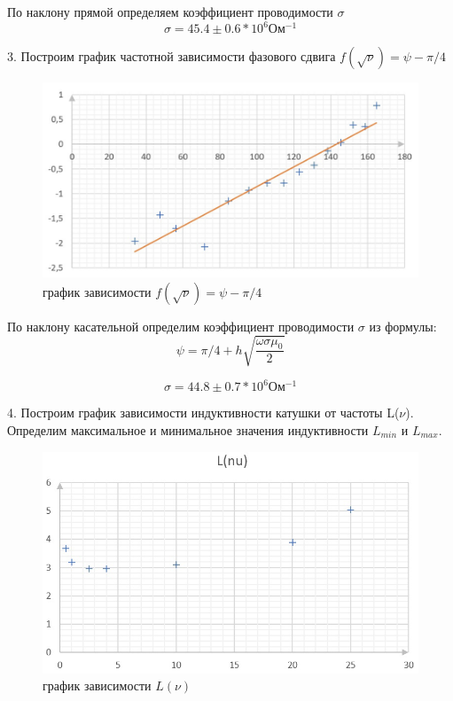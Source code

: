 \documentclass[a4paper, 12pt]{article} %
\begin{document}
По наклону прямой определяем коэффициент проводимости $\sigma$
	\begin{equation*}
\sigma = 45.4 \pm 0.6 * 10^6 Ом^{-1}
	\end{equation*}
	
3. Построим график частотной зависимости фазового сдвига $f(\sqrt{\nu}) = \psi - \pi/4$

		\begin{figure}
		\centering
		\includegraphics[width = 15cm]{graph3.jpg}
		\caption{график зависимости $f(\sqrt{\nu}) = \psi - \pi/4$}
	\end{figure}
	
По наклону касательной определим коэффициент проводимости $\sigma$ из формулы:
	\begin{equation*}
\psi = \pi/4 + h\sqrt{\frac{\omega\sigma\mu_0}{2}}
	\end{equation*}

	\begin{equation*}
\sigma = 44.8 \pm 0.7 * 10^6 Ом^{-1}
	\end{equation*}	
	
4. Построим график зависимости индуктивности катушки от частоты L($\nu$). Определим максимальное и минимальное значения индуктивности $L_{min}$ и $L_{max}$.

		\begin{figure}
		\centering
		\includegraphics[width = 15cm]{graph4.jpg}
		\caption{график зависимости $L(\nu)$}
	\end{figure}	
\end{document}
